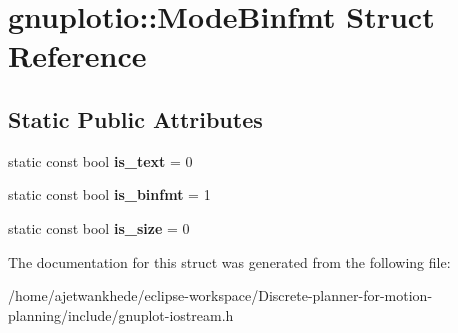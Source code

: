 \hypertarget{structgnuplotio_1_1ModeBinfmt}{}\section{gnuplotio\+:\+:Mode\+Binfmt Struct Reference}
\label{structgnuplotio_1_1ModeBinfmt}
\subsection*{Static Public Attributes}
\begin{DoxyCompactItemize}
\item 
\mbox{\label{structgnuplotio_1_1ModeBinfmt_a7ab187fe922cac23b0d39ade81e5eb56}} 
static const bool {\bfseries is\+\_\+text} = 0
\item 
\mbox{\label{structgnuplotio_1_1ModeBinfmt_ab0d5d3718364cdea0347f93ec121d841}} 
static const bool {\bfseries is\+\_\+binfmt} = 1
\item 
\mbox{\label{structgnuplotio_1_1ModeBinfmt_a40a5a8ee815d6a5e9a3c30c8290a6967}} 
static const bool {\bfseries is\+\_\+size} = 0
\end{DoxyCompactItemize}


The documentation for this struct was generated from the following file\+:\begin{DoxyCompactItemize}
\item 
/home/ajetwankhede/eclipse-\/workspace/\+Discrete-\/planner-\/for-\/motion-\/planning/include/gnuplot-\/iostream.\+h\end{DoxyCompactItemize}
